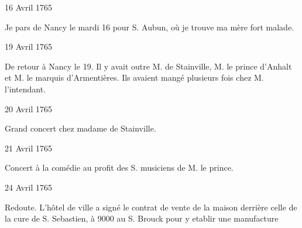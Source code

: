                      \begin{diary}{16 Avril 1765}{}
                        
                         Je pars de Nancy
                           le mardi 16 pour S.
                              Aubun, où je trouve ma
                              mère fort malade. \bigskip
        
        
                     \end{diary}

                     \begin{diary}{19 Avril 1765}{}
                        
                         De retour à Nancy
                           le 19. Il y avait outre
                           M. de Stainville, M. le prince d'Anhalt et M.
                              le marquis d'Armentières. Ils avaient mangé
                           plusieurs fois chez
                           M. l'intendant. \bigskip
        
        
                     \end{diary}

                     \begin{diary}{20 Avril 1765}{}
                        
                         Grand concert chez
                           madame de Stainville. \bigskip
        
        
                     \end{diary}

                     \begin{diary}{21 Avril 1765}{}
                        
                         Concert à la comédie au profit des S.
                            musiciens de M. le prince. \bigskip
        
        
                     \end{diary}

                     \begin{diary}{24 Avril 1765}{}
                        
                         Redoute. L'hôtel de ville a signé le contrat
                           de vente de la maison derrière celle de la
                              cure de S. Sebastien, à 9000\up{#} au S. Brouck
                           pour y etablir une manufacture \bigskip
        
        
                     \end{diary}
                     
